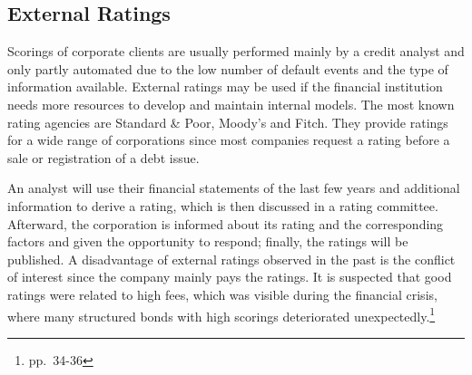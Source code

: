 \vspace{-1cm}
\subsection{External Ratings}
Scorings of corporate clients are usually performed mainly by a credit analyst and only partly automated due to the low number of default events and the type of information available. External ratings may be used if the financial institution needs more resources to develop and maintain internal models. The most known rating agencies are Standard \& Poor, Moody's and Fitch. They provide ratings for a wide range of corporations since most companies request a rating before a sale or registration of a debt issue. 

An analyst will use their financial statements of the last few years and additional information to derive a rating, which is then discussed in a rating committee. Afterward, the corporation is informed about its rating and the corresponding factors and given the opportunity to respond; finally, the ratings will be published. A disadvantage of external ratings observed in the past is the conflict of interest since the company mainly pays the ratings. It is suspected that good ratings were related to high fees, which was visible during the financial crisis, where many structured bonds with high scorings deteriorated unexpectedly.\footnote{\cite{Witzany:2017} pp.~34-36}